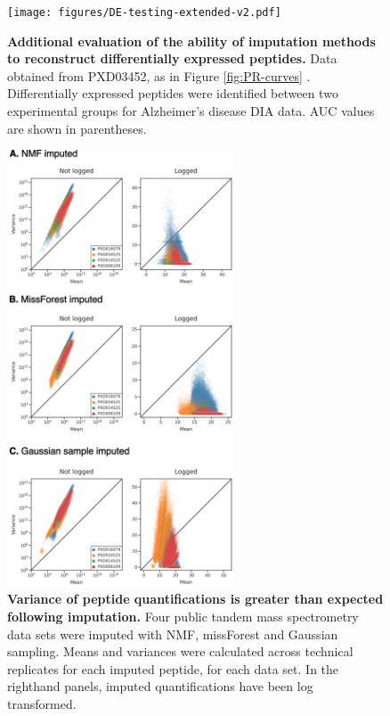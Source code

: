 \documentclass{article}
\begin{document}
\begin{figure}
  \centering
  \texttt{[image: figures/DE-testing-extended-v2.pdf]}
  \caption{{\bf Additional evaluation of the ability of imputation methods to reconstruct differentially expressed peptides.} Data obtained from PXD03452, as in Figure \ref{fig:PR-curves} \cite{smtg-maccoss}. Differentially expressed peptides were identified between two experimental groups for Alzheimer's disease DIA data. AUC values are shown in parentheses.}
  \label{fig:DE-extended}
\end{figure}

\begin{figure}
  \centering
  \includegraphics[width=0.6\textwidth]{figures/imputed-distributions-v2.png}
  \caption{{\bf Variance of peptide quantifications is greater than expected following imputation.} Four public tandem mass spectrometry data sets were imputed with NMF, missForest and Gaussian sampling. Means and variances were calculated across technical replicates for each imputed peptide, for each data set. In the righthand panels, imputed quantifications have been log transformed.}
  \label{fig:distributions-post-impute}
\end{figure} 
\end{document}
